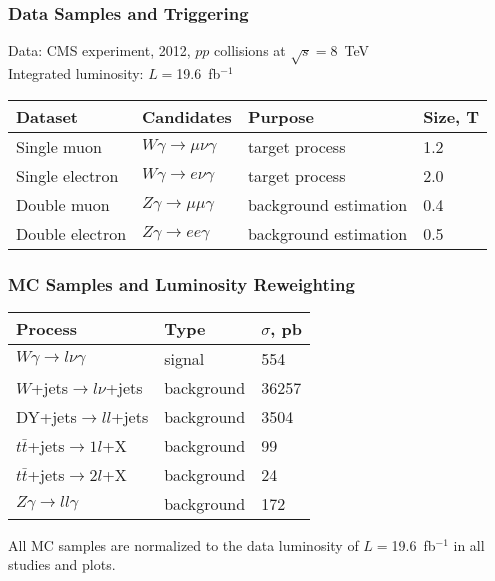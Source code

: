 \begin{frame}\frametitle{Data Samples and Triggering}
\scriptsize
Data: CMS experiment, 2012,  $pp$ collisions at $\sqrt{s}=$8~TeV\\
Integrated luminosity: $L=$19.6~fb$^{-1}$ 

\begin{table}[h]
  \scriptsize
  \begin{center}
    \begin{tabular}{|l|l|l|l|}
      \hline
      Dataset          & Candidates                        &  Purpose   & Size, T   \\ \hline
      Single muon      & $W\gamma\rightarrow\mu\nu\gamma$  &  target process   & 1.2 \\ \hline %
      Single electron  & $W\gamma\rightarrow e\nu\gamma$   &  target process   & 2.0 \\ \hline %
      Double muon      & $Z\gamma\rightarrow\mu\mu\gamma$  &  background estimation   & 0.4 \\ \hline %
      Double electron  & $Z\gamma\rightarrow ee\gamma$     &  background estimation   & 0.5 \\ \hline %
    \end{tabular}
  \end{center}
\end{table} 
\end{frame}%


\begin{frame}\frametitle{MC Samples and Luminosity Reweighting}
\begin{table}[h]
  \scriptsize
  \begin{center}
    \begin{tabular}{|l|l|l|}
      \hline
      Process                              & Type & $\sigma$, pb  \\ \hline
      $W\gamma \rightarrow l\nu\gamma$     & signal & 554   \\ \hline %
      $W$+jets$ \rightarrow l\nu $+jets   & background & 36257  \\ \hline %
      DY+jets$ \rightarrow ll $+jets     & background & 3504  \\ \hline %
      $t\bar{t}$+jets$\rightarrow 1l$+X    & background & 99    \\ \hline %
      $t\bar{t}$+jets$\rightarrow 2l$+X    & background & 24    \\ \hline
      $Z\gamma \rightarrow ll\gamma$       & background & 172   \\ \hline
    \end{tabular}
    \label{tab:mc_bkg_samples}
  \end{center}
\end{table} 

\scriptsize
All MC samples are normalized to the data luminosity of $L=$19.6~fb$^{-1}$ in all studies and plots.

\end{frame}%
